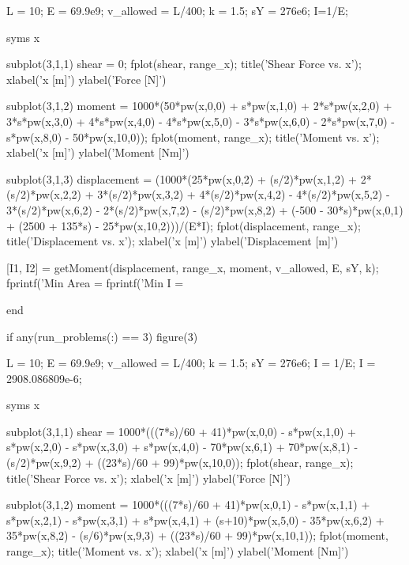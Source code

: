 \documentclass[a4paper]{article}
\begin{document}
\begin{verbatim*}
    L = 10; %
    E = 69.9e9; %
    v_allowed = L/400; %
    k = 1.5; %
    sY = 276e6; %
    I=1/E;

    syms x

    subplot(3,1,1)
    shear = 0;
    fplot(shear, range_x);
    title('Shear Force vs. x');
    xlabel('x [m]')
    ylabel('Force [N]')

    subplot(3,1,2)
    moment = 1000*(50*pw(x,0,0) + s*pw(x,1,0) + 2*s*pw(x,2,0) + 3*s*pw(x,3,0) + 4*s*pw(x,4,0) - 4*s*pw(x,5,0) - 3*s*pw(x,6,0) - 2*s*pw(x,7,0) - s*pw(x,8,0) - 50*pw(x,10,0));
    fplot(moment, range_x);
    title('Moment vs. x');
    xlabel('x [m]')
    ylabel('Moment [Nm]')

    subplot(3,1,3)
    displacement = (1000*(25*pw(x,0,2) + (s/2)*pw(x,1,2) + 2*(s/2)*pw(x,2,2) + 3*(s/2)*pw(x,3,2) + 4*(s/2)*pw(x,4,2) - 4*(s/2)*pw(x,5,2) - 3*(s/2)*pw(x,6,2) - 2*(s/2)*pw(x,7,2) - (s/2)*pw(x,8,2) + (-500 - 30*s)*pw(x,0,1) + (2500 + 135*s) - 25*pw(x,10,2)))/(E*I);
    fplot(displacement, range_x);
    title('Displacement vs. x');
    xlabel('x [m]')
    ylabel('Displacement [m]')

    [I1, I2] = getMoment(displacement, range_x, moment, v_allowed, E, sY, k);
    fprintf('Min Area = %
    fprintf('Min I = %
    
end

if any(run_problems(:) == 3)
    figure(3)

    L = 10; %
    E = 69.9e9; %
    v_allowed = L/400; %
    k = 1.5; %
    sY = 276e6; %
    I = 1/E;
    I = 2908.086809e-6; %

    syms x

    subplot(3,1,1)
    shear = 1000*(((7*s)/60 + 41)*pw(x,0,0) - s*pw(x,1,0) + s*pw(x,2,0) - s*pw(x,3,0) + s*pw(x,4,0) - 70*pw(x,6,1) + 70*pw(x,8,1) - (s/2)*pw(x,9,2)  + ((23*s)/60 + 99)*pw(x,10,0));
    fplot(shear, range_x);
    title('Shear Force vs. x');
    xlabel('x [m]')
    ylabel('Force [N]')

    subplot(3,1,2)
    moment = 1000*(((7*s)/60 + 41)*pw(x,0,1) - s*pw(x,1,1) + s*pw(x,2,1) - s*pw(x,3,1) + s*pw(x,4,1) + (s+10)*pw(x,5,0) - 35*pw(x,6,2) + 35*pw(x,8,2) - (s/6)*pw(x,9,3) + ((23*s)/60 + 99)*pw(x,10,1));
    fplot(moment, range_x);
    title('Moment vs. x');
    xlabel('x [m]')
    ylabel('Moment [Nm]')


\end{verbatim*}
\end{document}
